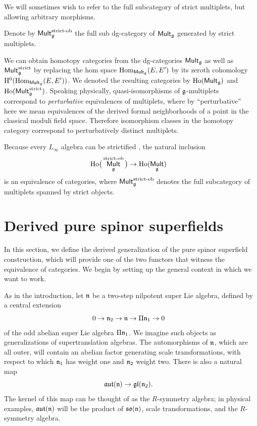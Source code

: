 \documentclass[11pt]{article}
\numberwithin{equation}{section}
\numberwithin{equation}{section}
\def\cat#1{\ensuremath{\mathsf{#1}}}
\DeclareMathOperator{\Mult}{\cat{Mult}}
\def\lie#1{\ensuremath{\mathfrak{#1}}}
\def\aut{\ensuremath{\lie{aut}}}
\def\so{\lie{so}}
\DeclareMathOperator{\Hom}{Hom}
\begin{document}
We will sometimes wish to refer to the full subcategory of strict multiplets, but allowing arbitrary morphisms.
\begin{dfn}
	Denote by $\Mult_{\fg}^{\text{\rm strict-ob}}$ the full sub dg-category of $\Mult_{\fg}$ generated by strict multiplets.
\end{dfn}


We can obtain homotopy categories from the dg-categories $\Mult_{\fg}$ as well as $\Mult_{\fg}^{\mathrm{strict}}$ by replacing the hom space $\Hom_{\Mult_{\fg}}(E, E')$ by its zeroth cohomology $\mathrm H^0(\mathrm{Hom}_{\Mult_{\fg}}(E, E'))$. We denoted the resulting categories by $\mathrm{Ho}(\Mult_{\fg})$ and $\mathrm{Ho}(\Mult_{\fg}^{\mathrm{strict}})$. Speaking physically, quasi-isomorphisms of $\mathfrak g$-multiplets correspond to \emph{perturbative} equivalences of multiplets, where by ``perturbative'' here we mean equivalences of the derived formal neighborhoods of a point in the classical moduli field space. Therefore isomorphism classes in the homotopy category correspond to perturbatively distinct multiplets.


\begin{rmk}
	Because every $L_\infty$ algebra can be strictified \cite[Part II, Corollary 1.6]{KrizMay}, the natural inclusion
	\begin{equation*}
	\mathrm{Ho}\big(\Mult_{\fg}^{\text{\rm strict-ob}}\big) \to \mathrm{Ho}(\Mult_{\fg})
	\end{equation*}
	is an equivalence of categories, where $\Mult_{\fg}^{\text{\rm strict-ob}}$ denotes the full subcategory of multiplets spanned by strict objects.
\end{rmk}

\setcounter{section}{2}
\section{Derived pure spinor superfields}
In this section, we define the derived generalization of the pure spinor superfield construction, which will provide one of the two functors that witness the equivalence of categories. We begin by setting up the general context in which we want to work.

As in the introduction, let $\mathfrak n$ be a two-step nilpotent super Lie algebra, defined by a central extension
\begin{equation}\label{eq:2step}
	0 \to \fn_2 \to \fn \to \Pi \fn_1 \to 0
\end{equation}
of the odd abelian super Lie algebra $\Pi \mathfrak n_1$. We imagine such objects as generalizations of supertranslation algebras. The automorphisms of $\mathfrak n$, which are all outer, will contain an abelian factor generating scale transformations, with respect to which $\mathfrak n_1$ has weight one and $\mathfrak n_2$ weight two. There is also a natural map
\begin{equation*}
	\aut(\fn) \to \lie{gl}(\fn_2).
\end{equation*}
The kernel of this map can be thought of as the $R$-symmetry algebra; in physical examples, $\aut(\fn)$ will be the product of $\so(\fn)$, scale transformations, and the $R$-symmetry algebra.
\end{document}
